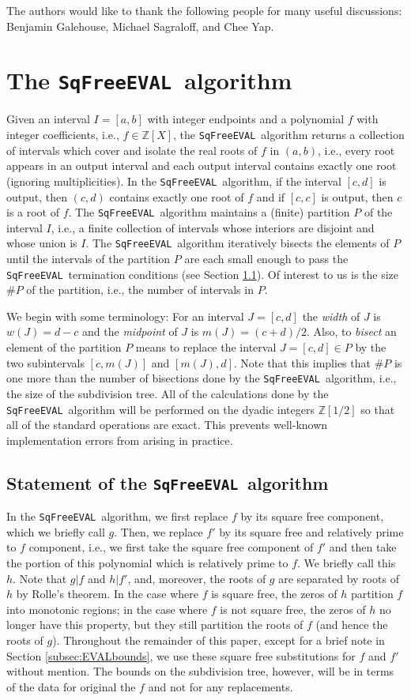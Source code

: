 \documentclass{amsart}
\theoremstyle{definition}
\newcommand{\EVAL}{\texttt{SqFreeEVAL}}
\begin{document}
The authors would like to thank the following people for many useful discussions: Benjamin Galehouse, Michael Sagraloff, and Chee Yap.

\section{The \EVAL\ algorithm}\label{Sec:EVAL}
Given an interval $I=[a,b]$ with integer endpoints and a polynomial $f$ with integer coefficients, i.e., $f\in\mathbb{Z}[X]$, the \EVAL\ algorithm returns a collection of intervals which cover and isolate the real roots of $f$ in $(a,b)$, i.e., every root appears in an output interval and each output interval contains exactly one root (ignoring multiplicities).  In the \EVAL\ algorithm, if the interval $[c,d]$ is output, then $(c,d)$ contains exactly one root of $f$ and if $[c,c]$ is output, then $c$ is a root of $f$.  The \EVAL\ algorithm maintains a (finite) partition $P$ of the interval $I$, i.e., a finite collection of intervals whose interiors are disjoint and whose union is $I$.  The \EVAL\ algorithm iteratively bisects the elements of $P$ until the intervals of the partition $P$ are each small enough to pass the \EVAL\ termination conditions (see Section \ref{Subsec:EVAL}).  Of interest to us is the size $\#P$ of the partition, i.e., the number of intervals in $P$.

We begin with some terminology: For an interval $J=[c,d]$ the {\em width} of $J$ is $w(J)=d-c$ and the {\em midpoint} of $J$ is $m(J)=(c+d)/2$.  Also, to {\em bisect} an element of the partition $P$ means to replace the interval $J=[c,d]\in P$ by the two subintervals $[c,m(J)]$ and $[m(J),d]$.  Note that this implies that $\#P$ is one more than the number of bisections done by the \EVAL\ algorithm, i.e., the size of the subdivision tree. All of the calculations done by the \EVAL\ algorithm will be performed on the dyadic integers $\mathbb{Z}[1/2]$ so that all of the standard operations are exact.  This prevents well-known implementation errors from arising in practice.
\subsection{Statement of the \EVAL\ algorithm}\label{Subsec:EVAL}
In the \EVAL\ algorithm, we first replace $f$ by its square free component, which we briefly call $g$.  Then, we replace $f'$ by its square free and relatively prime to $f$ component, i.e., we first take the square free component of $f'$ and then take the portion of this polynomial which is relatively prime to $f$.  We briefly call this $h$.  Note that $g|f$ and $h|f'$, and, moreover, the roots of $g$ are separated by roots of $h$ by Rolle's theorem.  In the case where $f$ is square free, the zeros of $h$ partition $f$ into monotonic regions; in the case where $f$ is not square free, the zeros of $h$ no longer have this property, but they still partition the roots of $f$ (and hence the roots of $g$).  Throughout the remainder of this paper, except for a brief note in Section \ref{subsec:EVALbounds}, we use these square free substitutions for $f$ and $f'$ without mention.  The bounds on the subdivision tree, however, will be in terms of the data for original the $f$ and not for any replacements.
\end{document}
